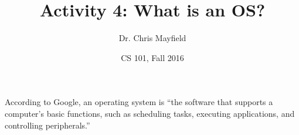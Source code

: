 \documentclass[12pt]{article}
\title{Activity 4: What is an OS?}
\author{Dr. Chris Mayfield}
\date{CS 101, Fall 2016}
\begin{document}
\maketitle

According to Google, an operating system is ``the software that supports a computer's basic functions, such as scheduling tasks, executing applications, and controlling peripherals.''



\end{document}
